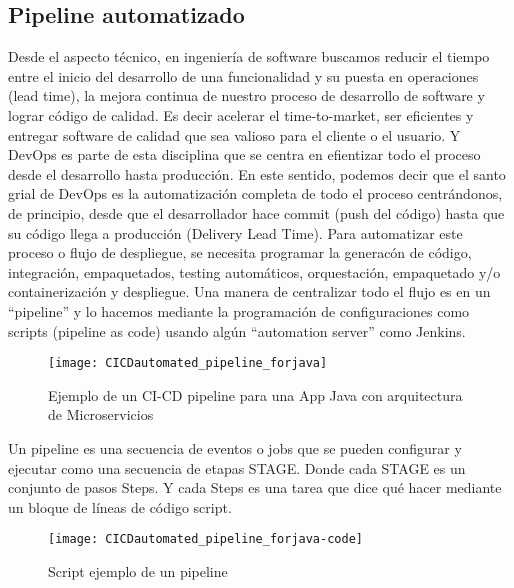 \subsection{Pipeline automatizado}

Desde el aspecto técnico, en ingeniería de software buscamos reducir el tiempo entre el inicio del desarrollo de una funcionalidad y su puesta en operaciones (lead time), la mejora continua de nuestro proceso de desarrollo de software y lograr código de calidad. Es decir acelerar el time-to-market, ser eficientes y entregar software de calidad que sea valioso para el cliente o el usuario. Y DevOps es parte de esta disciplina que se centra en efientizar todo el proceso desde el desarrollo hasta producción. En este sentido, podemos decir que el santo grial de DevOps es la automatización completa de todo el proceso centrándonos, de principio, desde que el desarrollador hace commit (push del código) hasta que su código llega a producción (Delivery Lead Time). Para automatizar este proceso o flujo de despliegue, se necesita programar la generacón de código, integración, empaquetados, testing automáticos, orquestación, empaquetado y/o containerización y despliegue. Una manera de centralizar todo el flujo es en un “pipeline” y lo hacemos mediante la programación de configuraciones como scripts (pipeline as code) usando algún “automation server” como Jenkins. 

\begin{figure}[h]
  \centering
  \texttt{[image: CICDautomated\_pipeline\_forjava]}
  \caption{Ejemplo de un CI-CD pipeline para una App Java con arquitectura de Microservicios}
  \centering
  \label{fig:CICDautomated_pipeline_forjava} %
\end{figure}
\FloatBarrier %


Un pipeline es una secuencia de eventos o jobs que se pueden configurar y ejecutar como una secuencia de etapas STAGE. Donde cada STAGE es un conjunto de pasos Steps. Y cada Steps es una tarea que dice qué hacer mediante un bloque de líneas de código script.

\begin{figure}[h]
  \centering
  \texttt{[image: CICDautomated\_pipeline\_forjava-code]}
  \caption{Script ejemplo de un pipeline}
  \centering
  \label{fig:CICDautomated_pipeline_forjava-code} %
\end{figure}
\FloatBarrier %

